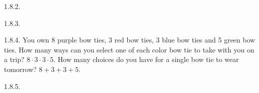 \begin {itemize}
\begin{ans}{1.8.2.}
\end{ans}
\begin{ans}{1.8.3.}
  
\end{ans}
\begin{ans}{1.8.4.}
		You own 8 purple bow ties, 3 red bow ties, 3 blue bow ties and 5 green bow ties.  How many ways can you select one of each color bow tie to take with you on a trip?  $8 \cdot 3 \cdot 3 \cdot 5$.  How many choices do you have for a single bow tie to wear tomorrow?  $8 + 3 + 3 + 5$.
	
\end{ans}
\begin{ans}{1.8.5.}
\end{ans}
\end{itemize}
